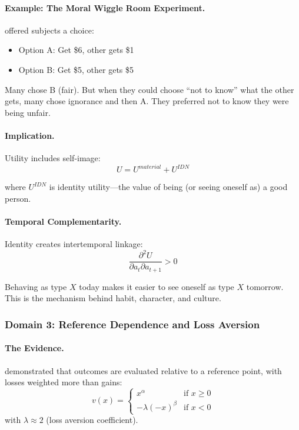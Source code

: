 \documentclass[12pt,a4paper]{article}
\begin{document}
\paragraph{Example: The Moral Wiggle Room Experiment.}
\citet{danaberton2007} offered subjects a choice:
\begin{itemize}
  \item Option A: Get \$6, other gets \$1
  \item Option B: Get \$5, other gets \$5
\end{itemize}

Many chose B (fair). But when they could choose ``not to know'' what the other gets,
many chose ignorance and then A. They preferred not to know they were being unfair.

\paragraph{Implication.}
Utility includes self-image:
\begin{equation}
  U = U^{material} + U^{IDN}
\end{equation}

where $U^{IDN}$ is identity utility---the value of being (or seeing oneself as) a good person.

\paragraph{Temporal Complementarity.}
Identity creates intertemporal linkage:
\begin{equation}
  \frac{\partial^2 U}{\partial a_t \partial a_{t+1}} > 0
\end{equation}

Behaving as type $X$ today makes it easier to see oneself as type $X$ tomorrow.
This is the mechanism behind habit, character, and culture.

\subsubsection{Domain 3: Reference Dependence and Loss Aversion}

\paragraph{The Evidence.}
\citet{kahnemantversky1979} demonstrated that outcomes are evaluated
relative to a reference point, with losses weighted more than gains:
\begin{equation}
  v(x) = \begin{cases}
    x^\alpha & \text{if } x \geq 0 \\
    -\lambda (-x)^\beta & \text{if } x < 0
  \end{cases}
\end{equation}
with $\lambda \approx 2$ (loss aversion coefficient).
\end{document}

